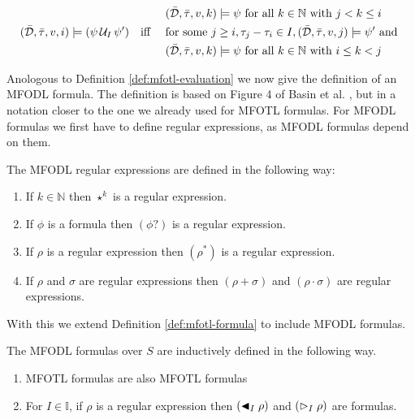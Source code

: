 \begin{definition}
\begin{alignat*}{3}
            &&&&&(\bar{\mathcal{D}}, \bar{\tau}, v, k) \models \psi \text{ for all } k \in \mathbb{N} \text{ with } j < k \leq i \\
        &(\bar{\mathcal{D}},\bar{\tau},v,i) \models (\psi \,\mathcal{U}_{I}\, \psi')
            &&\text{iff } && \text{for some } j \geq i, \tau_j - \tau_i \in I, (\bar{\mathcal{D}}, \bar{\tau}, v, j) \models \psi' \text{ and } \\
            &&&&&(\bar{\mathcal{D}}, \bar{\tau}, v, k) \models \psi \text{ for all } k \in \mathbb{N} \text{ with } i \leq k < j \\
    \end{alignat*}
\end{definition}

Anologous to Definition \ref{def:mfotl-evaluation} we now give the definition of an MFODL formula.
The definition is based on Figure 4 of Basin et al. \cite{Basin2020}, but in a notation closer to the one we already used for MFOTL formulas.
For MFODL formulas we first have to define regular expressions, as MFODL formulas depend on them.
\renewcommand{\labelenumi}{(\roman{enumi})}
\begin{definition}
    \label{def:mfodl-formula}
    The MFODL regular expressions are defined in the following way:
    \begin{enumerate}
        \item If $k \in \mathbb{N}$ then $\star^k$ is a regular expression.
        \item If $\phi$ is a formula then $(\phi ?)$ is a regular expression.
        \item If $\rho$ is a regular expression then $(\rho^*)$ is a regular expression.
        \item If $\rho$ and $\sigma$ are regular expressions then $(\rho + \sigma)$ and $(\rho \cdot \sigma)$ are regular expressions.
    \end{enumerate}
\end{definition}
With this we extend Definition \ref{def:mfotl-formula} to include MFODL formulas.
\begin{definition}
    The MFODL formulas over $S$ are inductively defined in the following way.
    \label{def:regex}
    \begin{enumerate}
        \item MFOTL formulas are also MFOTL formulas
        \item For $I \in \mathbb{I}$, if $\rho$ is a regular expression then $(\blacktriangleleft_{I} \rho)$ and $(\vartriangleright_{I} \rho)$ are formulas.
    \end{enumerate}
\end{definition}
